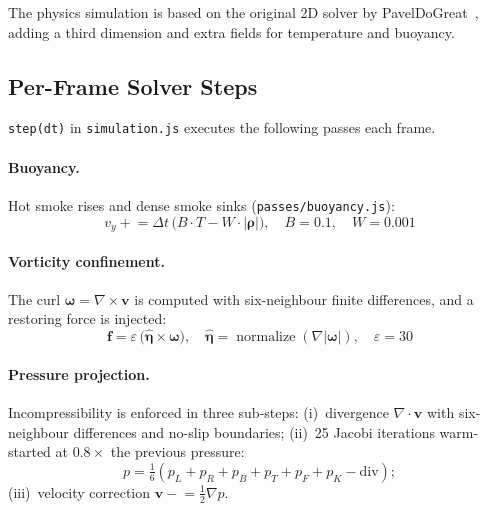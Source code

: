 \documentclass[a4paper, 12pt]{article}
\begin{document}
The physics simulation is based on the original 2D solver by PavelDoGreat~\cite{pavelfluid}, adding a third dimension and extra fields for temperature and buoyancy.



\subsection{Per-Frame Solver Steps}

\texttt{step(dt)} in \texttt{simulation.js} executes the following passes each
frame.

\paragraph{Buoyancy.}
Hot smoke rises and dense smoke sinks (\texttt{passes/buoyancy.js}):
\[
  v_y \mathrel{+}= \Delta t\,\bigl(B\cdot T - W\cdot|\boldsymbol{\rho}|\bigr),
  \quad B=0.1,\quad W=0.001
\]

\paragraph{Vorticity confinement.}
The curl $\boldsymbol{\omega}=\nabla\times\mathbf{v}$ is computed with
six-neighbour finite differences, and a restoring force is injected:
\[
  \mathbf{f} = \varepsilon\,\bigl(\hat{\boldsymbol{\eta}}\times\boldsymbol{\omega}\bigr),
  \quad \hat{\boldsymbol{\eta}} = \operatorname{normalize}(\nabla|\boldsymbol{\omega}|),
  \quad \varepsilon = 30
\]

\paragraph{Pressure projection.}
Incompressibility is enforced in three sub-steps:
(i)~divergence $\nabla\cdot\mathbf{v}$ with six-neighbour differences and
no-slip boundaries;
(ii)~25 Jacobi iterations warm-started at $0.8\times$ the previous pressure:
\[p = \tfrac{1}{6}(p_L+p_R+p_B+p_T+p_F+p_K - \mathrm{div});\]
(iii)~velocity correction $\mathbf{v}\mathrel{-}=\tfrac{1}{2}\nabla p$.
\end{document}
